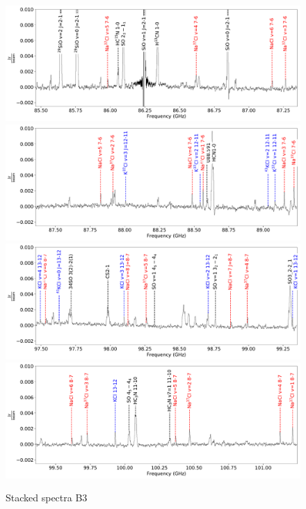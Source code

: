 \documentclass[twocolumn]{aastex62}
\begin{document}
\begin{figure}[!htp]
\includegraphics[scale=1,width=5.5in]{figures/color_labels_OrionSourceI_B3_spw0_robust0.5.pdf}
\includegraphics[scale=1,width=5.5in]{figures/color_labels_OrionSourceI_B3_spw1_robust0.5.pdf}
\includegraphics[scale=1,width=5.5in]{figures/color_labels_OrionSourceI_B3_spw2_robust0.5.pdf}
\includegraphics[scale=1,width=5.5in]{figures/color_labels_OrionSourceI_B3_spw3_robust0.5.pdf}
\caption{Stacked spectra  B3}
\label{fig:spectrab3}
\end{figure}
\end{document}
